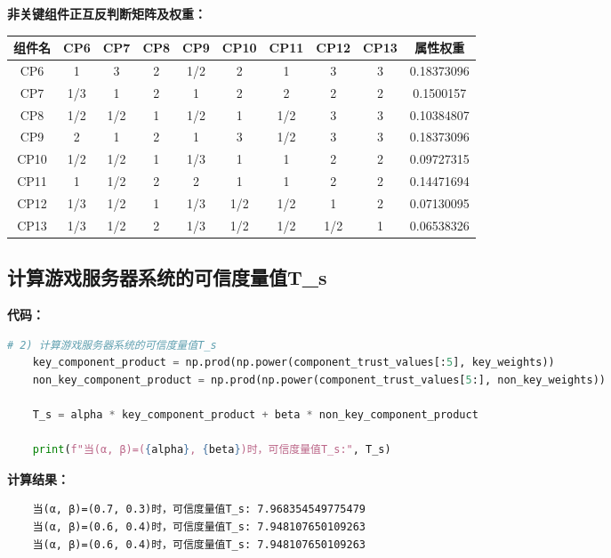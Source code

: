 \documentclass{article}
\begin{document}
\textbf{非关键组件正互反判断矩阵及权重：}

\begin{center}
	\begin{tabular}{|c|c|c|c|c|c|c|c|c|c|}
		\hline
		组件名 & CP6 & CP7 & CP8 & CP9 & CP10 & CP11 & CP12 & CP13 & 属性权重 \\
		\hline
		CP6 & 1 & 3 & 2 & 1/2 & 2 & 1 & 3 & 3 & 0.18373096 \\
		\hline
		CP7 & 1/3 & 1 & 2 & 1 & 2 & 2 & 2 & 2 & 0.1500157 \\
		\hline
		CP8 & 1/2 & 1/2 & 1 & 1/2 & 1 & 1/2 & 3 & 3 & 0.10384807 \\
		\hline
		CP9 & 2 & 1 & 2 & 1 & 3 & 1/2 & 3 & 3 & 0.18373096 \\
		\hline
		CP10 & 1/2 & 1/2 & 1 & 1/3 & 1 & 1 & 2 & 2 & 0.09727315 \\
		\hline
		CP11 & 1 & 1/2 & 2 & 2 & 1 & 1 & 2 & 2 & 0.14471694 \\
		\hline
		CP12 & 1/3 & 1/2 & 1 & 1/3 & 1/2 & 1/2 & 1 & 2 & 0.07130095 \\
		\hline
		CP13 & 1/3 & 1/2 & 2 & 1/3 & 1/2 & 1/2 & 1/2 & 1 & 0.06538326 \\
		\hline
	\end{tabular}
\end{center}

\subsection{计算游戏服务器系统的可信度量值T\_s}

\textbf{代码：}

\begin{lstlisting}[language=Python]
	# 2) 计算游戏服务器系统的可信度量值T_s
	key_component_product = np.prod(np.power(component_trust_values[:5], key_weights))
	non_key_component_product = np.prod(np.power(component_trust_values[5:], non_key_weights))
	
	T_s = alpha * key_component_product + beta * non_key_component_product
	
	print(f"当(α, β)=({alpha}, {beta})时，可信度量值T_s:", T_s)
\end{lstlisting}

\textbf{计算结果：}

\begin{lstlisting}
	当(α, β)=(0.7, 0.3)时，可信度量值T_s: 7.968354549775479
	当(α, β)=(0.6, 0.4)时，可信度量值T_s: 7.948107650109263
	当(α, β)=(0.6, 0.4)时，可信度量值T_s: 7.948107650109263
\end{lstlisting}
\end{document}
